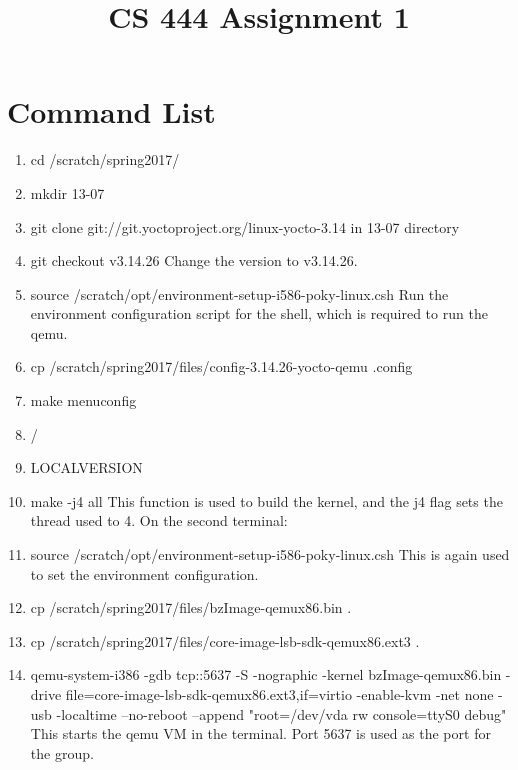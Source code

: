 \documentclass[letterpaper,10pt,titlepage]{IEEEtran}
\author{\name}
\title{CS 444 Assignment 1}
\begin{document}
\maketitle
\hrulefill

\section{Command List}
	\begin{enumerate}
	\item cd /scratch/spring2017/
    \item mkdir 13-07
    \item git clone git://git.yoctoproject.org/linux-yocto-3.14 in 13-07 directory
    \item git checkout v3.14.26
    Change the version to v3.14.26.
    \item source /scratch/opt/environment-setup-i586-poky-linux.csh 
    \newline 
    Run the environment configuration script for the shell, which is required to run the qemu.
    \item cp /scratch/spring2017/files/config-3.14.26-yocto-qemu .config
    \item make menuconfig
    \item /
    \item LOCALVERSION 
    \item make -j4 all
    \newline 
    This function is used to build the kernel, and the j4 flag sets the thread used to 4.
    \newline
    \newline 
    On the second terminal:
    \item source /scratch/opt/environment-setup-i586-poky-linux.csh 
    \newline 
    This is again used to set the environment configuration.
    \item cp /scratch/spring2017/files/bzImage-qemux86.bin . 
    \item cp /scratch/spring2017/files/core-image-lsb-sdk-qemux86.ext3 . 
    \item qemu-system-i386 -gdb tcp::5637 -S -nographic -kernel bzImage-qemux86.bin -drive file=core-image-lsb-sdk-qemux86.ext3,if=virtio -enable-kvm -net none -usb -localtime --no-reboot --append "root=/dev/vda rw console=ttyS0 debug" 
    \newline
    This starts the qemu VM in the terminal. Port 5637 is used as the port for the group.
    \newline

\end{enumerate}
\end{document}
